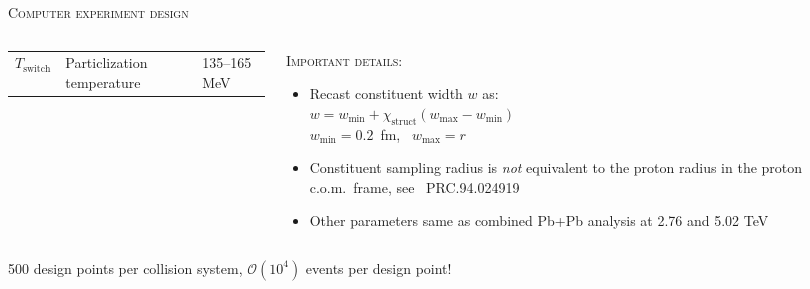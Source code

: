 \documentclass[aspectratio=169]{beamer}
\newcommand{\X}{\chi_\text{struct}}
\begin{document}
\begin{frame}[t]{\scshape Computer experiment design}
\begin{columns}[T]
\begin{column}{.6\textwidth}
\begin{tabular}{lll}
        $T_\text{switch}$ & Particlization temperature         & 135--165 MeV    \\
      \end{tabular}
    \end{column}
    \begin{column}{.4\textwidth}
      \textcolor{theme}{\scshape Important details:}
      \smallskip
      \begin{itemize}
        \small
        \item Recast constituent width $w$ as:\\[1ex]
          $w = w_\text{min} + \X(w_\text{max} - w_\text{min})$\\[1ex]
          $w_\text{min} = 0.2$~fm,~ $w_\text{max} = r$\\[1ex]
        \item Constituent sampling radius is \emph{not} equivalent to the proton radius
          in the proton c.o.m.\ frame, see~ \textcolor{theme}{\scriptsize PRC.94.024919}\\[1ex]
        \item Other parameters same as combined Pb+Pb analysis at 2.76 and 5.02 TeV
      \end{itemize}
    \end{column}
  \end{columns}
  \begin{center}
    \color{theme}
    500 design points per collision system, $\mathcal{O}(10^4)$ events per design point!
  \end{center}
\end{frame}

\begin{frame}[plain]
\end{frame}
\end{document}
